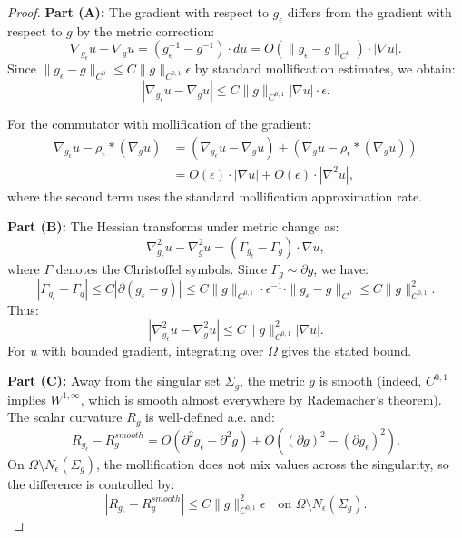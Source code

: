 \begin{proof}
\textbf{Part (A):} The gradient with respect to $g_\epsilon$ differs from the gradient with respect to $g$ by the metric correction:
\begin{equation}
    \nabla_{g_\epsilon} u - \nabla_g u = (g_\epsilon^{-1} - g^{-1}) \cdot du = O(\|g_\epsilon - g\|_{C^0}) \cdot |\nabla u|.
\end{equation}
Since $\|g_\epsilon - g\|_{C^0} \le C \|g\|_{C^{0,1}} \epsilon$ by standard mollification estimates, we obtain:
\begin{equation}
    |\nabla_{g_\epsilon} u - \nabla_g u| \le C \|g\|_{C^{0,1}} |\nabla u| \cdot \epsilon.
\end{equation}

For the commutator with mollification of the gradient:
\begin{align}
    \nabla_{g_\epsilon} u - \rho_\epsilon * (\nabla_g u) &= (\nabla_{g_\epsilon} u - \nabla_g u) + (\nabla_g u - \rho_\epsilon * (\nabla_g u)) \\
    &= O(\epsilon) \cdot |\nabla u| + O(\epsilon) \cdot |\nabla^2 u|,
\end{align}
where the second term uses the standard mollification approximation rate.

\textbf{Part (B):} The Hessian transforms under metric change as:
\begin{equation}
    \nabla^2_{g_\epsilon} u - \nabla^2_g u = (\Gamma_{g_\epsilon} - \Gamma_g) \cdot \nabla u,
\end{equation}
where $\Gamma$ denotes the Christoffel symbols. Since $\Gamma_g \sim \partial g$, we have:
\begin{equation}
    |\Gamma_{g_\epsilon} - \Gamma_g| \le C |\partial(g_\epsilon - g)| \le C \|g\|_{C^{0,1}} \cdot \epsilon^{-1} \cdot \|g_\epsilon - g\|_{C^0} \le C \|g\|_{C^{0,1}}^2.
\end{equation}
Thus:
\begin{equation}
    |\nabla^2_{g_\epsilon} u - \nabla^2_g u| \le C \|g\|_{C^{0,1}}^2 |\nabla u|.
\end{equation}
For $u$ with bounded gradient, integrating over $\Omega$ gives the stated bound.

\textbf{Part (C):} Away from the singular set $\Sigma_g$, the metric $g$ is smooth (indeed, $C^{0,1}$ implies $W^{1,\infty}$, which is smooth almost everywhere by Rademacher's theorem). The scalar curvature $R_g$ is well-defined a.e. and:
\begin{equation}
    R_{g_\epsilon} - R_g^{smooth} = O(\partial^2 g_\epsilon - \partial^2 g) + O((\partial g)^2 - (\partial g_\epsilon)^2).
\end{equation}
On $\Omega \setminus N_\epsilon(\Sigma_g)$, the mollification does not mix values across the singularity, so the difference is controlled by:
\begin{equation}
    |R_{g_\epsilon} - R_g^{smooth}| \le C \|g\|_{C^{0,1}}^2 \epsilon \quad \text{on } \Omega \setminus N_\epsilon(\Sigma_g).
\end{equation}


\end{proof}
